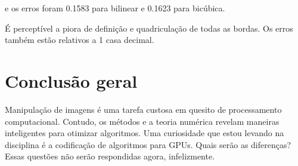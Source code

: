 \documentclass{article}
\begin{document}
e os erros foram 0.1583 para bilinear e 0.1623 para bicúbica.

É perceptível a piora de definição e quadriculação de todas as bordas.
Os erros também estão relativos a 1 casa decimal.

\section{Conclusão geral}

Manipulação de imagens é uma tarefa custosa em quesito de processamento
computacional. Contudo, os métodos e a teoria numérica revelam maneiras
inteligentes para otimizar algoritmos. Uma curiosidade que estou levando
na disciplina é a codificação de algoritmos para GPUs. Quais serão as 
diferenças? Essas questões não serão respondidas agora, infelizmente.
\end{document}
